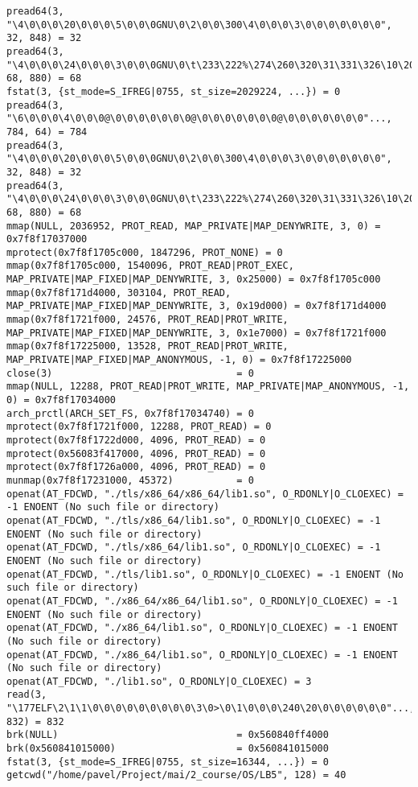 \documentclass[pdf, unicode, 12pt, a4paper,oneside,fleqn]{article}
\begin{document}
{\begin{verbatim}
pread64(3, "\4\0\0\0\20\0\0\0\5\0\0\0GNU\0\2\0\0\300\4\0\0\0\3\0\0\0\0\0\0\0", 32, 848) = 32
pread64(3, "\4\0\0\0\24\0\0\0\3\0\0\0GNU\0\t\233\222%\274\260\320\31\331\326\10\204\276X>\263"..., 68, 880) = 68
fstat(3, {st_mode=S_IFREG|0755, st_size=2029224, ...}) = 0
pread64(3, "\6\0\0\0\4\0\0\0@\0\0\0\0\0\0\0@\0\0\0\0\0\0\0@\0\0\0\0\0\0\0"..., 784, 64) = 784
pread64(3, "\4\0\0\0\20\0\0\0\5\0\0\0GNU\0\2\0\0\300\4\0\0\0\3\0\0\0\0\0\0\0", 32, 848) = 32
pread64(3, "\4\0\0\0\24\0\0\0\3\0\0\0GNU\0\t\233\222%\274\260\320\31\331\326\10\204\276X>\263"..., 68, 880) = 68
mmap(NULL, 2036952, PROT_READ, MAP_PRIVATE|MAP_DENYWRITE, 3, 0) = 0x7f8f17037000
mprotect(0x7f8f1705c000, 1847296, PROT_NONE) = 0
mmap(0x7f8f1705c000, 1540096, PROT_READ|PROT_EXEC, MAP_PRIVATE|MAP_FIXED|MAP_DENYWRITE, 3, 0x25000) = 0x7f8f1705c000
mmap(0x7f8f171d4000, 303104, PROT_READ, MAP_PRIVATE|MAP_FIXED|MAP_DENYWRITE, 3, 0x19d000) = 0x7f8f171d4000
mmap(0x7f8f1721f000, 24576, PROT_READ|PROT_WRITE, MAP_PRIVATE|MAP_FIXED|MAP_DENYWRITE, 3, 0x1e7000) = 0x7f8f1721f000
mmap(0x7f8f17225000, 13528, PROT_READ|PROT_WRITE, MAP_PRIVATE|MAP_FIXED|MAP_ANONYMOUS, -1, 0) = 0x7f8f17225000
close(3)                                = 0
mmap(NULL, 12288, PROT_READ|PROT_WRITE, MAP_PRIVATE|MAP_ANONYMOUS, -1, 0) = 0x7f8f17034000
arch_prctl(ARCH_SET_FS, 0x7f8f17034740) = 0
mprotect(0x7f8f1721f000, 12288, PROT_READ) = 0
mprotect(0x7f8f1722d000, 4096, PROT_READ) = 0
mprotect(0x56083f417000, 4096, PROT_READ) = 0
mprotect(0x7f8f1726a000, 4096, PROT_READ) = 0
munmap(0x7f8f17231000, 45372)           = 0
openat(AT_FDCWD, "./tls/x86_64/x86_64/lib1.so", O_RDONLY|O_CLOEXEC) = -1 ENOENT (No such file or directory)
openat(AT_FDCWD, "./tls/x86_64/lib1.so", O_RDONLY|O_CLOEXEC) = -1 ENOENT (No such file or directory)
openat(AT_FDCWD, "./tls/x86_64/lib1.so", O_RDONLY|O_CLOEXEC) = -1 ENOENT (No such file or directory)
openat(AT_FDCWD, "./tls/lib1.so", O_RDONLY|O_CLOEXEC) = -1 ENOENT (No such file or directory)
openat(AT_FDCWD, "./x86_64/x86_64/lib1.so", O_RDONLY|O_CLOEXEC) = -1 ENOENT (No such file or directory)
openat(AT_FDCWD, "./x86_64/lib1.so", O_RDONLY|O_CLOEXEC) = -1 ENOENT (No such file or directory)
openat(AT_FDCWD, "./x86_64/lib1.so", O_RDONLY|O_CLOEXEC) = -1 ENOENT (No such file or directory)
openat(AT_FDCWD, "./lib1.so", O_RDONLY|O_CLOEXEC) = 3
read(3, "\177ELF\2\1\1\0\0\0\0\0\0\0\0\0\3\0>\0\1\0\0\0\240\20\0\0\0\0\0\0"..., 832) = 832
brk(NULL)                               = 0x560840ff4000
brk(0x560841015000)                     = 0x560841015000
fstat(3, {st_mode=S_IFREG|0755, st_size=16344, ...}) = 0
getcwd("/home/pavel/Project/mai/2_course/OS/LB5", 128) = 40

\end{verbatim}}
\end{document}

